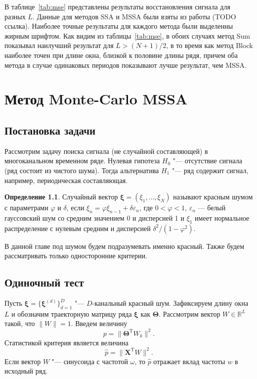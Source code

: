 \documentclass[specialist,
substylefile = spbu_report.rtx,
subf,href,colorlinks=true, 12pt]{disser}
\newcommand{\traj}{\mathbf{X}}
\newcommand{\transponse}{^\mathrm{T}}
\theoremstyle{definition}
\newtheorem{definition}{Определение}
\newcommand{\R}{\mathbb{R}}
\begin{document}
	В таблице~\ref{tab:mse} представлены результаты восстановления сигнала для разных $L$. Данные для методов SSA и MSSA были взяты из работы (TODO ссылка). Наиболее точные результаты для каждого метода были выделенны жирным шрифтом. Как видим из таблицы~\ref{tab:mse}, в обоих случаях метод Sum показывал наилучший результат для $L>(N+1)/2$, в то время как метод Block наиболее точен при длине окна, близкой к половине длины рядя, причем оба метода в случае одинаковых периодов показывают лучше результат, чем MSSA.

	\chapter{Метод Monte-Carlo MSSA}
	\section{Постановка задачи}
	Рассмотрим задачу поиска сигнала (не случайной составляющей) в многоканальном временном ряде. Нулевая гипотеза $H_0$ "--- отсутствие сигнала (ряд состоит из чистого шума). Тогда альтернатива $H_1$ "--- ряд содержит сигнал, например, периодическая составляющая.
	\begin{definition}
		Случайный вектор $\boldsymbol{\xi}=(\xi_1,\dots,\xi_N)$ называют красным шумом с параметрами $\varphi$ и $\delta$, если $\xi_n = \varphi\xi_{n-1} + \delta\varepsilon_n$, где $0<\varphi<1$, $\varepsilon_n$ — белый гауссовский шум со средним значением 0 и дисперсией 1 и $\xi_1$ имеет нормальное распределение с нулевым средним и дисперсией $\delta^2/(1-\varphi^2)$.
	\end{definition}
	В данной главе под шумом будем подразумевать именно красный. Также будем рассматривать только односторонние критерии.
	\section{Одиночный тест}
	Пусть $\boldsymbol{\xi}=\{\boldsymbol{\xi}^{(d)}\}_{d=1}^D$ "--- $D$-канальный красный шум. Зафиксируем длину окна $L$ и обозначим траекторную матрицу ряда $\boldsymbol{\xi}$ как $\mathbf\Theta$. Рассмотрим вектор $W\in \R^{L}$ такой, что $\|W\|=1$. Введем величину
	\[
	p=\|\mathbf{\Theta}\transponse W_k\|^2.
	\]
	Статистикой критерия является величина
	\[
	\widehat{p}=\|\traj\transponse W\|^2.
	\]
	Если вектор $W$ "--- синусоида с частотой $\omega$, то $\widehat{p}$ отражает вклад частоты $w$ в исходный ряд.
	
\end{document}
